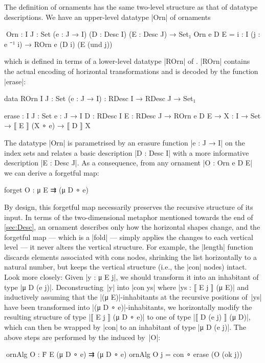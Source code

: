 The definition of ornaments has the same two-level structure as that of datatype descriptions.
We have an upper-level datatype |Orn| of ornaments
\begin{code}
^^^Orn : {I J : Set} (e : J → I) (D : Desc I) (E : Desc J) → Set₁
Orn e D E = {i : I} (j : e ⁻¹ i) → ROrn e (D i) (E (und j))
\end{code}
which is defined in terms of a lower-level datatype |ROrn| of .
|ROrn| contains the actual encoding of horizontal transformations and is decoded by the function |erase|:
\begin{code}
data ROrn {I J : Set} (e : J → I) : RDesc I → RDesc J → Set₁
           
erase :  {I J : Set} {e : J → I} {D : RDesc I} {E : RDesc J} →
         ROrn e D E → {X : I → Set} → ⟦ E ⟧ (X ∘ e) → ⟦ D ⟧ X
\end{code}
The datatype |Orn| is parametrised by an erasure function |e : J → I| on the index sets and relates a basic description |D : Desc I| with a more informative description |E : Desc J|.
As a consequence, from any ornament |O : Orn e D E| we can derive a forgetful map:
\begin{spec}
forget O : μ E ⇉ (μ D ∘ e)
\end{spec}
By design, this forgetful map necessarily preserves the recursive structure of its input.
In terms of the two-dimensional metaphor mentioned towards the end of \autoref{sec:Desc}, an ornament describes only how the horizontal shapes change, and the forgetful map --- which is a |fold| --- simply applies the changes to each vertical level --- it never alters the vertical structure.
For example, the |length| function discards elements associated with cons nodes, shrinking the list horizontally to a natural number, but keeps the vertical structure (i.e., the |con| nodes) intact.
Look more closely:
Given |y : μ E j|, we should transform it into an inhabitant of type |μ D (e j)|.
Deconstructing~|y| into |con ys| where |ys : ⟦ E j ⟧ (μ E)| and inductively assuming that the |(μ E)|-inhabitants at the recursive positions of~|ys| have been transformed into |(μ D ∘ e)|-inhabitants, we horizontally modify the resulting structure of type |⟦ E j ⟧ (μ D ∘ e)| to one of type |⟦ D (e j) ⟧ (μ D)|, which can then be wrapped by |con| to an inhabitant of type |μ D (e j)|.
The above steps are performed by the  induced by~|O|:
\begin{code}
^^^ornAlg O : Ḟ E (μ D ∘ e) ⇉ (μ D ∘ e)
ornAlg O {j} = con ∘ erase (O (ok j))
\end{code}
